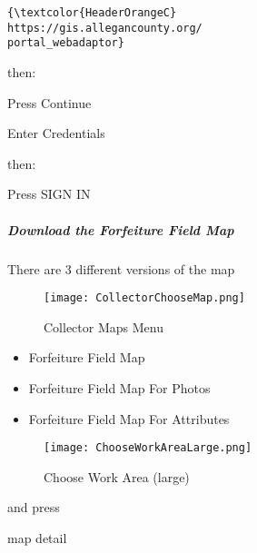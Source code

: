 \begin{verbatim}
{\textcolor{HeaderOrangeC}
https://gis.allegancounty.org/
portal_webadaptor}

\end{verbatim}
\large then:
\vspace{.5in}

\noindent Press \Large Continue
\vspace{1.5in}

\noindent Enter Credentials
\vspace{.5in}

\noindent \large then:
\vspace{.5in}

\noindent Press \Large SIGN IN
\clearpage
\subparagraph[Download the Forfeiture Field Map]{Download the Forfeiture Field Map \texorpdfstring{\\}{}}
\noindent There are 3 different versions of the map
\begin{wrapfigure}{r}{0.5\textwidth}
\centering
    \texttt{[image: CollectorChooseMap.png]}
\caption{Collector Maps Menu}
\end{wrapfigure}
\begin{itemize}
\item Forfeiture Field Map
\item Forfeiture Field Map For Photos
\item Forfeiture Field Map For Attributes
\end{itemize}
\vspace{.2in}

\vspace{.2in}

\clearpage
\begin{wrapfigure}{r}{0.5\textwidth}
\centering
    \texttt{[image: ChooseWorkAreaLarge.png]}
\caption{Choose Work Area (large)}
\end{wrapfigure}

\vspace{.2in}

and press
\vspace{.2in}

map detail
\vspace{.2in}

\clearpage
